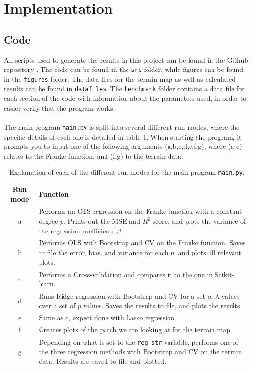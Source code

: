 \documentclass[a4paper]{article}
\begin{document}
\section{Implementation} \label{chap:implement}
\subsection{Code}
All scripts used to generate the results in this project can be found in the Github repository \cite{Github1}. The code can be found in the \texttt{src} folder, while figures can be found in the \texttt{figures} folder. The data files for the terrain map as well as calculated results can be found in \texttt{datafiles}. The \texttt{benchmark} folder contains a data file for each section of the code with information about the parameters used, in order to easier verify that the program works.
\\\\
The main program \texttt{main.py} is split into several different run modes, where the specific details of each one is detailed in table \ref{tab:run_modes}. When starting the program, it prompts you to input one of the following arguments (a,b,c,d,e,f,g), where (a-e) relates to the Franke function, and (f,g) to the terrain data.
\begin{table}[H]
  \centering
  \caption{Explanation of each of the different run modes for the main program \texttt{main.py}.}
  \label{tab:run_modes}
  \begin{tabular}{c|p{12cm}}
    \textbf{Run mode} & \textbf{Function}\\\hline
    a & Performs an OLS regression on the Franke function with a constant degree $p$. Prints out the MSE and $R^2$ score, and plots the variance of the regression coefficients $\beta$\\\hline
    b & Performs OLS with Bootstrap and CV on the Franke function. Saves to file the error, bias, and variance for each $p$, and plots all relevant plots.\\\hline
    c & Performs a Cross-validation and compares it to the one in Scikit-learn.\\\hline
    d & Runs Ridge regression with Bootstrap and CV for a set of $\lambda$ values over a set of $p$ values. Saves the results to file, and plots the results.\\\hline
    e & Same as c, expect done with Lasso regression\\\hline
    f & Creates plots of the patch we are looking at for the terrain map\\\hline
    g & Depending on what is set to the \texttt{reg\_str} variable, performs one of the three regression methods with Bootstrap and CV on the terrain data. Results are saved to file and plotted.
    \end{tabular}
\end{table}
\end{document}
